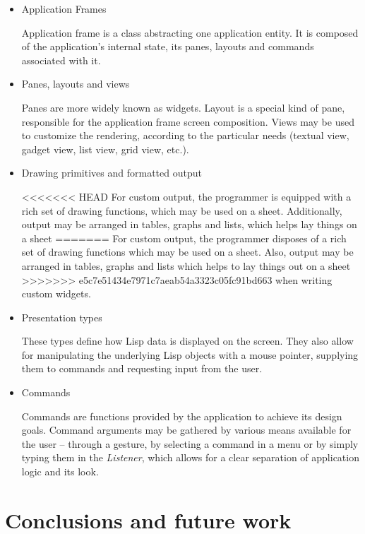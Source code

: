 \documentclass{sig-alternate-05-2015}
\begin{document}
\begin{itemize}
\item Application Frames

  Application frame is a class abstracting one application entity. It
  is composed of the application's internal state, its panes, layouts
  and commands associated with it.

\item Panes, layouts and views

  Panes are more widely known as widgets. Layout is a special kind of
  pane, responsible for the application frame screen composition. Views
  may be used to customize the rendering, according to the particular
  needs (textual view, gadget view, list view, grid view, etc.).

\item Drawing primitives and formatted output

<<<<<<< HEAD
  For custom output, the programmer is equipped with a rich set of drawing
  functions, which may be used on a sheet. Additionally, output may be
  arranged in tables, graphs and lists, which helps lay things on a sheet
=======
  For custom output, the programmer disposes of a rich set of drawing
  functions which may be used on a sheet. Also, output may be arranged
  in tables, graphs and lists which helps to lay things out on a sheet
>>>>>>> e5c7e51434e7971c7aeab54a3323c05fc91bd663
  when writing custom widgets.

\item Presentation types

  These types define how Lisp data is displayed on the screen. They
  also allow for manipulating the underlying Lisp objects with a mouse
  pointer, supplying them to commands and requesting input from the user.

\item Commands

  Commands are functions provided by the application to achieve its
  design goals. Command arguments may be gathered by various means
  available for the user – through a gesture, by selecting a command in
  a menu or by simply typing them in the \emph{Listener}\cite{listener},
  which allows for a clear separation of application logic and its look.
\end{itemize}

\section{Conclusions and future work}
\end{document}
